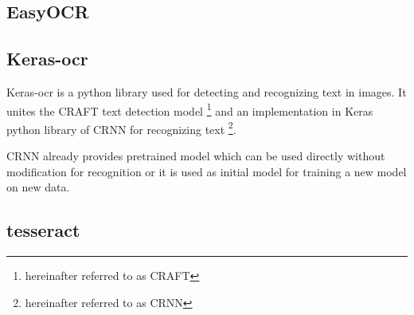\subsection{EasyOCR}
\subsection{Keras-ocr}

Keras-ocr is a python library used for detecting and recognizing text in images. It unites the CRAFT text detection model \footnote{hereinafter referred to as CRAFT} and an implementation in Keras python library of CRNN for recognizing text \footnote{hereinafter referred to as CRNN}. \cite{keras-ocr1}

CRNN already provides pretrained model which can be used directly without modification for recognition or it is used as initial model for training a new model on new data. 

\subsection{tesseract}





